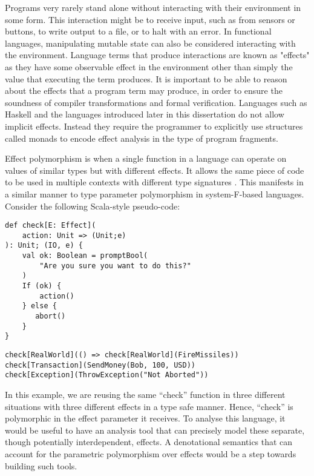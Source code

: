 \documentclass{Report}
\begin{document}
Programs very rarely stand alone without interacting with their environment in some form. This interaction might be to receive input, such as from sensors or buttons, to write output to a file, or to halt with an error. In functional languages, manipulating mutable state can also be considered interacting with the environment. Language terms that produce interactions are known as "effects" as they have some observable effect in the environment other than simply the value that executing the term produces. It is important to be able to reason about the effects that a program term may produce, in order to ensure the soundness of compiler transformations and formal verification. Languages such as Haskell and the languages introduced later in this dissertation do not allow implicit effects. Instead they require the programmer to explicitly use structures called monads  to encode effect analysis in the type of program fragments.


Effect polymorphism is when a single function in a language can operate on values of similar types but with different effects. It allows the same piece of code to be used in multiple contexts with different type signatures . This manifests in a similar manner to type parameter polymorphism in system-F-based languages. Consider the following Scala-style pseudo-code:

\begin{framed}
    \begin{framed}
        \begin{verbatim}
def check[E: Effect](
    action: Unit => (Unit;e)
): Unit; (IO, e) {
    val ok: Boolean = promptBool(
        "Are you sure you want to do this?"
    )
    If (ok) {
        action()
    } else {
       abort()
    }
}  
            \end{verbatim}
    \end{framed}

    \begin{framed}
        \begin{verbatim}
check[RealWorld](() => check[RealWorld](FireMissiles))
check[Transaction](SendMoney(Bob, 100, USD))
check[Exception](ThrowException("Not Aborted"))
        \end{verbatim}
    \end{framed}
\end{framed}

In this example, we are reusing the same “check” function in three different situations with three different effects in a type safe manner. Hence, “check” is polymorphic in the effect parameter it receives. To analyse this language, it would be useful to have an analysis tool that can precisely model these separate, though potentially interdependent, effects. A denotational semantics that can account for the parametric polymorphism over effects would be a step towards building such tools. 
\end{document}
